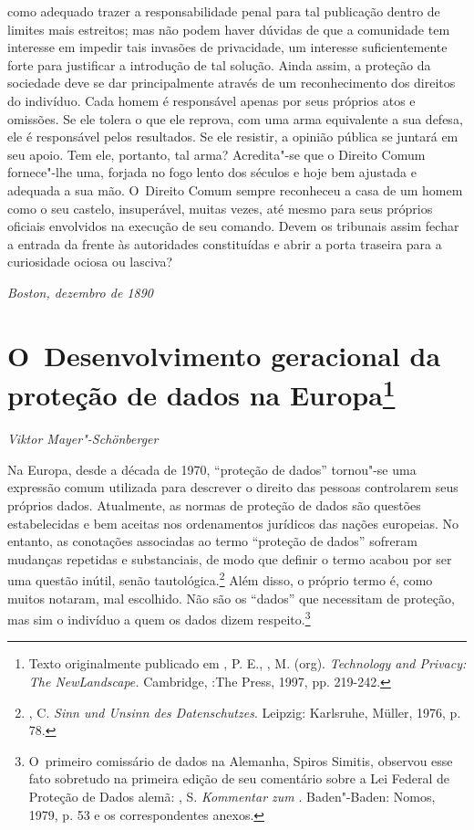 como adequado trazer a responsabilidade penal para tal publicação dentro
de limites mais estreitos; mas não podem haver dúvidas de que a
comunidade tem interesse em impedir tais invasões de privacidade, um
interesse suficientemente forte para justificar a introdução de tal
solução. Ainda assim, a proteção da sociedade deve se dar principalmente
através de um reconhecimento dos direitos do indivíduo. Cada homem é
responsável apenas por seus próprios atos e omissões. Se ele tolera o
que ele reprova, com uma arma equivalente a sua defesa, ele é
responsável pelos resultados. Se ele resistir, a opinião pública se
juntará em seu apoio. Tem ele, portanto, tal arma? Acredita"-se que o
Direito Comum fornece"-lhe uma, forjada no fogo lento dos séculos e hoje
bem ajustada e adequada a sua mão. O~Direito Comum sempre reconheceu a
casa de um homem como o seu castelo, insuperável, muitas vezes, até
mesmo para seus próprios oficiais envolvidos na execução de seu comando.
Devem os tribunais assim fechar a entrada da frente às autoridades
constituídas e abrir a porta traseira para a curiosidade ociosa ou
lasciva?

\medskip
\begin{flushright}
\emph{Boston, dezembro de 1890}
\end{flushright}

\chapter{O~Desenvolvimento geracional da proteção de dados na
Europa\footnote{Texto originalmente publicado em
  , P. E., , M. (org). \emph{Technology and Privacy: The
  NewLandscape.} Cambridge, :The  Press, 1997, pp. 219-242.}}\label{o-desenvolvimento-geracional-da-proteuxe7uxe3o-de-dados-na-europa}

\begin{flushright}
\emph{Viktor Mayer"-Schönberger}
\end{flushright}

Na Europa, desde a década de 1970, ``proteção de dados'' tornou"-se uma
expressão comum utilizada para descrever o direito das pessoas
controlarem seus próprios dados. Atualmente, as normas de proteção de
dados são questões estabelecidas e bem aceitas nos ordenamentos
jurídicos das nações europeias. No entanto, as conotações associadas ao
termo ``proteção de dados'' sofreram mudanças repetidas e substanciais,
de modo que definir o termo acabou por ser uma questão inútil, senão
tautológica.\footnote{, C. \emph{Sinn und Unsinn des
  Datenschutzes}. Leipzig: Karlsruhe, Müller, 1976, p. 78.} Além disso,
o próprio termo é, como muitos notaram, mal escolhido. Não são os
``dados'' que necessitam de proteção, mas sim o indivíduo a quem os
dados dizem respeito.\footnote{O~primeiro comissário de dados na
  Alemanha, Spiros Simitis, observou esse fato sobretudo na primeira
  edição de seu comentário sobre a Lei Federal de Proteção de Dados
  alemã: , S. \emph{Kommentar zum }. Baden"-Baden: Nomos,
  1979, p. 53 e os correspondentes anexos.}

